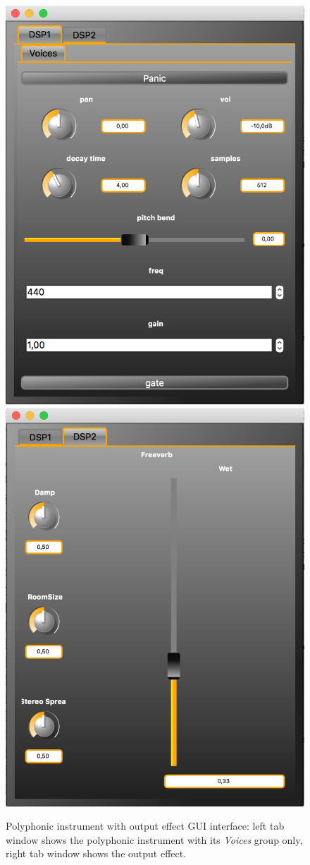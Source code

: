 \begin{figure}[!ht]
\begin{center}
\includegraphics[width=0.48\columnwidth]{images/poly_ui_effect1}
\includegraphics[width=0.48\columnwidth]{images/poly_ui_effect2}
\caption{\footnotesize Polyphonic instrument with output effect GUI interface: left tab window shows the polyphonic instrument with its {\it Voices} group only, right tab window shows the output effect.}
\label{fig:poly-ui-effect}
\end{center}
\end{figure}



